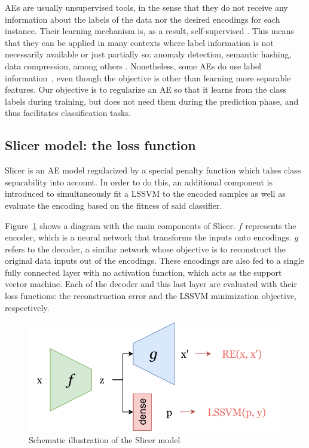 AEs are usually unsupervised tools, in the sense that they do not receive any information about the labels of the data nor the desired encodings for each instance. Their learning mechanism is, as a result, self-supervised \cite{liu2020self}. This means that they can be applied in many contexts where label information is not necessarily available or just partially so: anomaly detection, semantic hashing, data compression, among others \cite{CHARTE202093}. Nonetheless, some AEs do use label information~\cite{makhzani2015adversarial}, even though the objective is other than learning more separable features. Our objective is to regularize an AE so that it learns from the class labels during training, but does not need them during the prediction phase, and thus facilitates classification tasks.

\subsection{Slicer model: the loss function}

Slicer is an AE model regularized by a special penalty function which takes class separability into account. In order to do this, an additional component is introduced to simultaneously fit a LSSVM to the encoded samples as well as evaluate the encoding based on the fitness of said classifier.

Figure~\ref{p7fig:slicerdiag} shows a diagram with the main components of Slicer. $f$ represents the encoder, which is a neural network that transforms the inputs onto encodings. $g$ refers to the decoder, a similar network whose objective is to reconstruct the original data inputs out of the encodings. These encodings are also fed to a single fully connected layer with no activation function, which acts as the support vector machine. Each of the decoder and this last layer are evaluated with their loss functions: the reconstruction error and the LSSVM minimization objective, respectively.

\begin{figure}
    \centering
    \includegraphics[width=0.6\linewidth]{slicer.pdf}
    \caption{Schematic illustration of the Slicer model}
    \label{p7fig:slicerdiag}
\end{figure}

